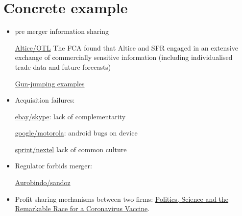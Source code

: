 \documentclass[a4paper,leqno]{article}%
\begin{document}
\section{Concrete example}



\begin{itemize}

    \item pre merger information sharing

    

    \href{https://sites-herbertsmithfreehills.vuturevx.com/46/12874/compose-email/the-altice-case--a-costly-warning-not-to-engage-in-gun-jumping-before-receiving-merger-control-clearance.asp}{Altice/OTL} The FCA found that Altice and SFR engaged in an extensive exchange of commercially sensitive information (including individualised trade data and future forecasts)

    

    \href{https://www.twobirds.com/en/news/articles/2020/global/double-caution-gun-jumping-risks-in-m-and-a-transactions}{Gun-jumping examples}

    \item Acquisition failures:

    

    \href{https://www.investopedia.com/articles/insights/061816/4-cases-when-ma-strategy-failed-acquirer-ebay-bac.asp}{ebay/skype}: lack of complementarity

    

    \href{https://salessynergy.net/the-biggest-acquisition-disasters-that-put-companies-into-quite-a-bit-of-trouble/}{google/motorola}: android bugs on device

    

    \href{https://www.investopedia.com/articles/financial-theory/08/merger-acquisition-disasters.asp#:~:text=The\%20consolidation\%20of\%20AOL\%20Time,combination\%20up\%20until\%20that\%20time}{sprint/nextel} lack of common culture

    

    \item Regulator forbids merger:

    

    \href{https://www.livemint.com/companies/news/aurobindo-pharma-calls-off-1-billion-deal-with-sandoz-after-failing-to-get-ftc-nod-11585801128011.html}{Aurobindo/sandoz}

    

    \item Profit sharing mechanisms between two firms: \href{https://www.nytimes.com/2020/11/21/us/politics/coronavirus-vaccine.html?referringSource=articleShare}{Politics, Science and the Remarkable Race for a Coronavirus Vaccine}.

\end{itemize}
\end{document}
